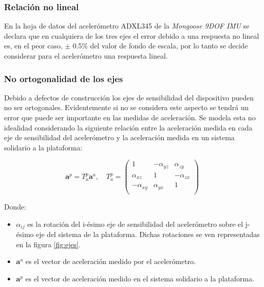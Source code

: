 \documentclass[main]{subfiles}
\begin{document}
\subsubsection*{Relación no lineal}
En la hoja de datos del acelerómetro ADXL345 de la \emph{Mongoose 9DOF IMU} se declara que en cualquiera de los tres ejes el error debido a una respuesta no lineal es, en el peor caso, $\pm$ 0.5\% del valor de fondo de escala, por lo tanto se decide considerar para el acelerómetro una respuesta lineal.

\subsubsection*{No ortogonalidad de los ejes}
Debido a defectos de construcción los ejes de sensibilidad del dispositivo pueden no ser ortogonales. Evidentemente si no se considera este aspecto se tendrá un error que puede ser importante en las medidas de aceleración. Se modela esta no idealidad considerando la siguiente relación entre la aceleración medida en cada eje de sensibilidad del acelerómetro y la aceleración medida en un sistema solidario a la plataforma:

\begin{equation}
\mathbf{a}^p=T^p_a \mathbf{a}^a, \quad  T^p_a=\left( \begin{matrix}
1 &-\alpha_{yz} &\alpha_{zy}\\
\alpha_{xz} &1& -\alpha_{zx} \\
-\alpha_{xy} &\alpha_{yx} &1\\
\end{matrix} 
\right)\end{equation}

Donde:
\begin{itemize}
\item $\alpha_{ij}$ es la rotación del  i-ésimo eje de sensibilidad del acelerómetro sobre el j-ésimo eje del sistema de la plataforma. Dichas rotaciones se ven representadas en la figura \ref{fig:ejes}.
\item $\mathbf{a}^a$ es el vector de aceleración medido por el acelerómetro.
\item $\mathbf{a}^p$ es el vector de aceleración medido en el sistema solidario a la plataforma.
\end{itemize}
\end{document}
